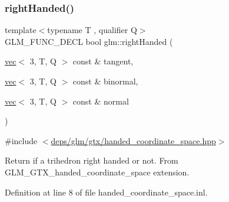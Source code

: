\subsubsection{\texorpdfstring{right\+Handed()}{rightHanded()}}
{\footnotesize\ttfamily template$<$typename T , qualifier Q$>$ \\
G\+L\+M\+\_\+\+F\+U\+N\+C\+\_\+\+D\+E\+CL bool glm\+::right\+Handed (\begin{DoxyParamCaption}\item[{\hyperlink{structglm_1_1vec}{vec}$<$ 3, T, Q $>$ const \&}]{tangent,  }\item[{\hyperlink{structglm_1_1vec}{vec}$<$ 3, T, Q $>$ const \&}]{binormal,  }\item[{\hyperlink{structglm_1_1vec}{vec}$<$ 3, T, Q $>$ const \&}]{normal }\end{DoxyParamCaption})}



{\ttfamily \#include $<$\hyperlink{handed__coordinate__space_8hpp}{deps/glm/gtx/handed\+\_\+coordinate\+\_\+space.\+hpp}$>$}

Return if a trihedron right handed or not. From G\+L\+M\+\_\+\+G\+T\+X\+\_\+handed\+\_\+coordinate\+\_\+space extension. 

Definition at line 8 of file handed\+\_\+coordinate\+\_\+space.\+inl.

